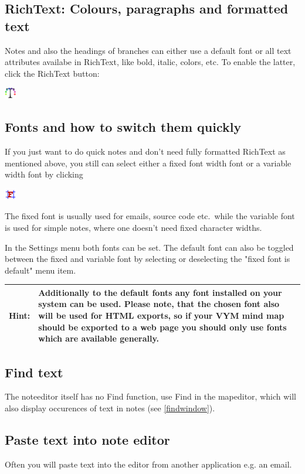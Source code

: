 \documentclass[12pt,a4paper]{article}
\newcommand{\hint}[1]{
    \begin{center} 
        \begin{tabular}{|rp{12cm}|} \hline
            {\bf Hint}:& #1\\   \hline
        \end{tabular}
            \marginpar{\Huge !} 
    \end{center} 
}
\begin{document}
\subsection{RichText: Colours, paragraphs and formatted text}
Notes and also the headings of branches can either use a default font or
all text attributes availabe in RichText, like bold, italic, colors,
etc. To enable the latter, click the RichText button:
\begin{center}
    \includegraphics[width=0.5cm]{../icons/formatrichtext.png}
\end{center}

\subsection{Fonts and how to switch them quickly}
If you just want to do quick notes and don't need fully formatted
RichText as mentioned above, you still can select either a fixed font
width font or a variable width font by clicking
\begin{center}
    \includegraphics[width=0.5cm]{../icons/formatfixedfont.png}
\end{center}


The fixed font is usually used for emails, source code etc.\ while the
variable font is used for simple notes, where one doesn't need fixed
character widths.  

In the Settings menu both fonts can be set. The default font can also be
toggled between the fixed and variable font by selecting or deselecting
the "fixed font is default" menu item.

\hint{Additionally to the default fonts any font installed on your system can
be used. Please note, that the chosen font also will be used for HTML
exports, so if your VYM mind map should  be exported to a web page
you should only use fonts which are available generally.}

\subsection{Find text}
The noteeditor itself has no Find function, use Find in the mapeditor,
which will also display occurences of text in notes (see
\ref{findwindow}).

\subsection{Paste text into note editor}
Often you will paste text into the editor from another application e.g.
an email.
\end{document}
